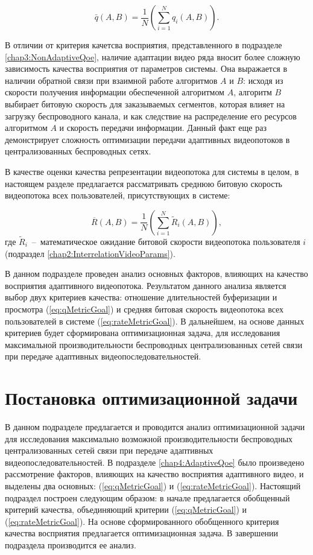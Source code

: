 \begin{equation}
	\label{eq:qMetricGoal}
	\bar{q}\left(A, B\right)=\frac{1}{N}\left(\sum\limits_{i=1}^{N} {q_i\left(A,B\right)}\right).
\end{equation}

В отличии от критерия качетсва восприятия, представленного в подразделе \ref{chap3:NonAdaptiveQoe}, наличие адаптации видео ряда вносит более сложную зависимость качества восприятия от параметров системы. Она выражается в наличии обратной связи при взаимной работе алгоритмов $A$ и $B$: исходя из скорости получения информации обеспеченной алгоритмом $A$, алгоритм $B$ выбирает битовую скорость для заказываемых сегментов, которая влияет на загрузку беспроводного канала, и как следствие на распределение его ресурсов алгоритмом $A$ и скорость передачи информации. Данный факт еще раз демонстрирует сложность оптимизации передачи адаптивных видеопотоков в централизованных беспроводных сетях.

В качестве оценки качества репрезентации видеопотока для системы в целом, в настоящем разделе предлагается рассматривать среднюю битовую скорость видеопотока всех пользователей, присутствующих в системе:

\begin{equation}
	\label{eq:rateMetricGoal}
	\overline{R}\left(A,B\right) = \frac{1}{N}\left(\sum\limits_{i=1}^{N} {\tilde{R}_i\left(A,B\right)}\right),
\end{equation}
где $\tilde{R}_i$~--~математическое ожидание битовой скорости видеопотока пользователя $i$ (подраздел \ref{chap2:InterrelationVideoParams}).

В данном подразделе проведен анализ основных факторов, влияющих на качество восприятия адаптивного видеопотока. Результатом данного анализа является выбор двух критериев качества: отношение длительностей буферизации и просмотра (\ref{eq:qMetricGoal}) и средняя битовая скорость видеопотока всех пользователей в системе (\ref{eq:rateMetricGoal}). В дальнейшем, на основе данных критериев будет сформирована оптимизационная задача, для исследования максимальной производительности беспроводных централизованных сетей связи при передаче адаптивных видеопоследовательностей.

\section{Постановка оптимизационной задачи}
\label{chap4:AdaptiveOptimizationProblem}

В данном подразделе предлагается и проводится анализ оптимизационной задачи для исследования максимально возможной производительности беспроводных централизованных сетей связи при передаче адаптивных видеопоследовательностей. В подразделе \ref{chap4:AdaptiveQoe} было произведено рассмотрение факторов, влияющих на качество восприятия адаптивного видео, и выделены два основных: (\ref{eq:qMetricGoal}) и (\ref{eq:rateMetricGoal}). Настоящий подраздел построен следующим образом: в начале предлагается обобщенный критерий качества, объединяющий критерии (\ref{eq:qMetricGoal}) и (\ref{eq:rateMetricGoal}). На основе сформированного обобщенного критерия качества восприятия предлагается оптимизационная задача. В завершении подраздела производится ее анализ.


